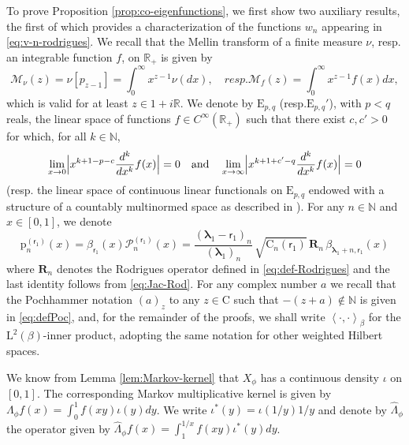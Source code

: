 \documentclass[11pt]{article}
\newcommand{\resp}{resp.\xspace}
\numberwithin{equation}{section}
\theoremstyle{plain}
\theoremstyle{definition}
\newcommand{\N}{\mathbb{N}}
\newcommand{\R}{\mathbb{R}}
\renewcommand{\P}{\mathcal{P}}
\newcommand{\calM}{\mathcal{M}}
\newcommand{\Rc}{\mathbf{R}}
\newcommand{\C}{{\mathrm{C}}}
\newcommand{\Em}{\mathrm{E}}
\newcommand{\Leb}{\mathrm{L}}
\newcommand{\pab}[1][\alpha,\beta]{\mathrm{p}^{(#1)}}
\newcommand{\lam}{{\bm{\lambda}_1}}
\newcommand{\vat}{{\mathsf{r}_1}}
\newcommand{\gab}[1][\lam,\mo]{{\beta_{#1}}}
\let\mo\mu
\let\bpsi\beta
\begin{document}
To prove Proposition \ref{prop:co-eigenfunctions}, we first show two auxiliary results, the first of which provides
a characterization of the functions $w_n$ appearing in \eqref{eq:v-n-rodrigues}.
We recall that the Mellin transform of a finite measure $\nu$, \resp an integrable function $f$, on $\R_+$ is given by
\begin{equation*}
\calM_{\nu}(z) = \nu[p_{z-1}] = \int_0^\infty x^{z-1}\nu(dx), \quad \resp \calM_{f}(z)=\int_0^\infty x^{z-1}f(x)dx,
\end{equation*}
which is valid for at least $z \in 1+i\R$. We denote by $\Em_{p,q}$ (\resp $\Em_{p,q}'$), with $p < q$ reals, the linear space of functions $f \in C^\infty(\R_+)$ such that there exist $c, c' > 0$ for which, for all $k \in \N$,
\begin{equation*}
\lim_{x\to 0} \Bigl| x^{k+1-p-c} \frac{d^k}{dx^k}f(x)\Bigr| = 0 \quad \text{and} \quad \lim_{x\to \infty} \Bigl| x^{k+1+c'-q} \frac{d^k}{dx^k}f(x)\Bigr| = 0
\end{equation*}
(\resp the linear space of continuous linear functionals on $\Em_{p,q}$ endowed with a structure of a countably multinormed space as described in \cite[p.\,231]{Misra-Lavoine}). For any $n \in \N$ and $x\in [0,1]$, we denote
\begin{equation*}
\pab[\vat]_n(x) = \gab[\vat](x) \P_n^{(\vat)}(x) = \frac{(\lam-\vat)_n}{(\lam)_n}\, \sqrt{\C_n(\vat)}\, \Rc_{n}\, \gab[\lam+n,\vat](x)
\end{equation*}
where $\Rc_{n}$ denotes the Rodrigues operator defined in \eqref{eq:def-Rodrigues} and the last identity follows from \eqref{eq:Jac-Rod}. For any complex number $a$ we recall that the Pochhammer notation $(a)_z$ to any $z \in \C$ such that $-(z+a) \notin \N$ is given in \eqref{eq:defPoc}, and, for the remainder of the proofs, we shall write $\left\langle \cdot{,}\cdot \right\rangle_{\bpsi}$ for the $\Leb^2(\bpsi)$-inner product, adopting the same notation for other weighted Hilbert spaces.

We know from Lemma \ref{lem:Markov-kernel} that $X_{\phi}$ has a continuous density $\iota$ on $[0,1]$.
The corresponding Markov multiplicative kernel is given by $\Lambda_{\phi} f(x) = \int_0^1 f(xy) \iota(y)dy$.
We write $\iota^*(y)=\iota(1/y)1/y$ and denote by $\hat{\Lambda}_{\phi}$ the operator given by
$\widehat{\Lambda}_{\phi} f(x) = \int_1^{1/x}f(xy)\iota^*(y)dy$.
\end{document}
